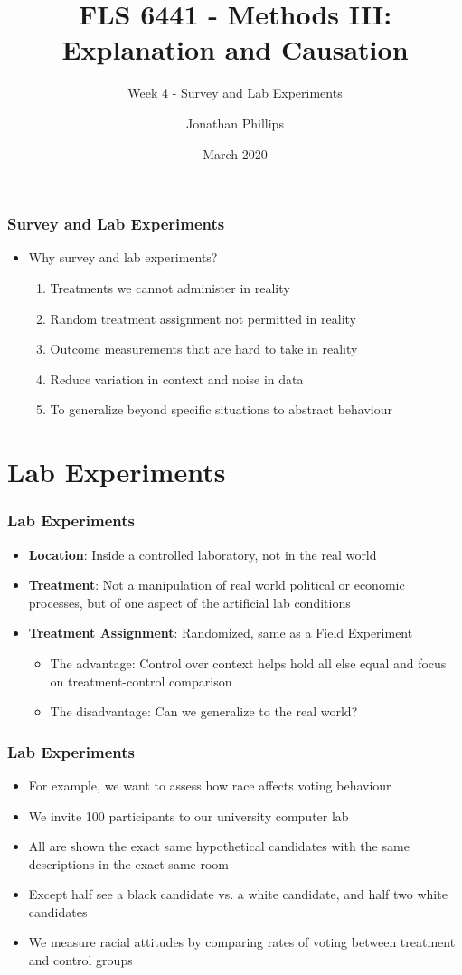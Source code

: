 \documentclass[xcolor=x11names,compress]{beamer}\usepackage[]{graphicx}\usepackage[]{color}
\title{FLS 6441 - Methods III: Explanation and Causation}
\subtitle{Week 4 - Survey and Lab Experiments}
\author{Jonathan Phillips}
\date{March 2020}
\renewcommand{\(}{\begin{columns}}
\renewcommand{\)}{\end{columns}}
\newcommand{\<}[1]{\begin{column}{#1}}
\renewcommand{\>}{\end{column}}
\begin{document}
\frame{\titlepage}

\begin{frame}
\frametitle{Survey and Lab Experiments}
\begin{itemize}
\item Why survey and lab experiments?
\pause
\begin{enumerate}
\item Treatments we cannot administer in reality
\pause
\item Random treatment assignment not permitted in reality
\pause
\item Outcome measurements that are hard to take in reality
\pause
\item Reduce variation in context and noise in data
\pause
\item To generalize beyond specific situations to abstract behaviour
\end{enumerate}
\end{itemize}
\end{frame}

\section{Lab Experiments}

\begin{frame}
\frametitle{Lab Experiments}
\begin{itemize}
\item \textbf{Location}: Inside a controlled laboratory, not in the real world
\pause
\item \textbf{Treatment}: Not a manipulation of real world political or economic processes, but of one aspect of the artificial lab conditions
\pause
\item \textbf{Treatment Assignment}: Randomized, same as a Field Experiment
\pause
\begin{itemize}
\item The advantage: Control over context helps hold all else equal and focus on treatment-control comparison
\pause
\item The disadvantage: Can we generalize to the real world?
\end{itemize}
\end{itemize}
\end{frame}

\begin{frame}
\frametitle{Lab Experiments}
\begin{itemize}
\item For example, we want to assess how race affects voting behaviour
\pause
\item We invite 100 participants to our university computer lab
\pause
\item All are shown the exact same hypothetical candidates with the same descriptions in the exact same room
\pause
\item Except half see a black candidate vs. a white candidate, and half two white candidates
\pause
\item We measure racial attitudes by comparing rates of voting between treatment and control groups
\end{itemize}
\end{frame}
\end{document}
